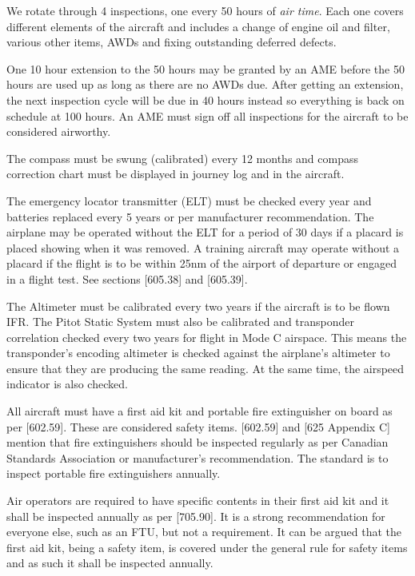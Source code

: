 \documentclass[12pt,letterpaper]{article}
\begin{document}
    We rotate through 4 inspections, one every 50 hours of \emph{air time}. Each one covers different elements of the aircraft and includes a change of engine oil and filter, various other items, AWDs and fixing outstanding deferred defects.
    
    One 10 hour extension to the 50 hours may be granted by an AME before the 50 hours are used up as long as there are no AWDs due. After getting an extension, the next inspection cycle will be due in 40 hours instead so everything is back on schedule at 100 hours. An AME must sign off all inspections for the aircraft to be considered airworthy.

    The compass must be swung (calibrated) every 12 months and compass correction chart must be displayed in journey log and in the aircraft.

    The emergency locator transmitter (ELT) must be checked every year and batteries replaced every 5 years or per manufacturer recommendation. The airplane may be operated without the ELT for a period of 30 days if a placard is placed showing when it was removed. A training aircraft may operate without a placard if the flight is to be within 25nm of the airport of departure or engaged in a flight test. See sections [605.38] and [605.39].

    The Altimeter must be calibrated every two years if the aircraft is to be flown IFR. The Pitot Static System must also be calibrated and transponder correlation checked every two years for flight in Mode C airspace. This means the transponder’s encoding altimeter is checked against the airplane’s altimeter to ensure that they are producing the same reading. At the same time, the airspeed indicator is also checked.
    
    All aircraft must have a first aid kit and portable fire extinguisher on board as per [602.59]. These are considered safety items. [602.59] and [625 Appendix C] mention that fire extinguishers should be inspected regularly as per Canadian Standards Association or manufacturer's recommendation. The standard is to inspect portable fire extinguishers annually.
    
    Air operators are required to have specific contents in their first aid kit and it shall be inspected annually as per [705.90]. It is a strong recommendation for everyone else, such as an FTU, but not a requirement. It can be argued that the first aid kit, being a safety item, is covered under the general rule for safety items and as such it shall be inspected annually.
    
\end{document}

